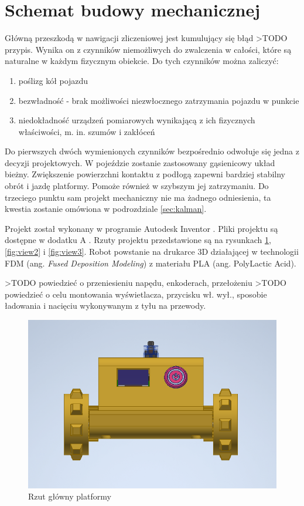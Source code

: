 \section{Schemat budowy mechanicznej}
Główną przeszkodą w nawigacji zliczeniowej jest kumulujący się błąd >TODO przypis. Wynika on z czynników niemożliwych do zwalczenia w całości, które są naturalne w każdym fizycznym obiekcie. Do tych czynników można zaliczyć: 
\begin{enumerate}
    \item poślizg kół pojazdu
    \item bezwładność - brak możliwości niezwłocznego zatrzymania pojazdu w punkcie
    \item niedokładność urządzeń pomiarowych wynikającą z ich fizycznych właściwości, m. in. szumów i zakłóceń
\end{enumerate}

Do pierwszych dwóch wymienionych czynników bezpośrednio odwołuje się jedna z decyzji projektowych. W pojeździe zostanie zastosowany gąsienicowy układ bieżny. Zwiększenie powierzchni kontaktu z podłogą zapewni bardziej stabilny obrót i jazdę platformy. Pomoże również w szybszym jej zatrzymaniu. Do trzeciego punktu sam projekt mechaniczny nie ma żadnego odniesienia, ta kwestia zostanie omówiona w podrozdziale \ref{sec:kalman}.

Projekt został wykonany w programie Autodesk Inventor \cite{inventor}. Pliki projektu są dostępne w dodatku A \label{sec:disc-addon}. Rzuty projektu przedstawione są na rysunkach \ref{fig:view1}, \ref{fig:view2} i \ref{fig:view3}. Robot powstanie na drukarce 3D działającej w technologii FDM (ang. \emph{Fused Deposition Modeling}) z materiału PLA (ang. PolyLactic Acid).

>TODO powiedzieć o przeniesieniu napędu, enkoderach, przełożeniu
>TODO powiedzieć o celu montowania wyświetlacza, przycisku wł. wył., sposobie ładowania i nacięciu wykonywanym z tyłu na przewody.


\begin{figure}[H]
	\centering
		\includegraphics[width=0.6\linewidth]{rys/view1.png}
	\caption{Rzut główny platformy}
	\label{fig:view1}
\end{figure}

